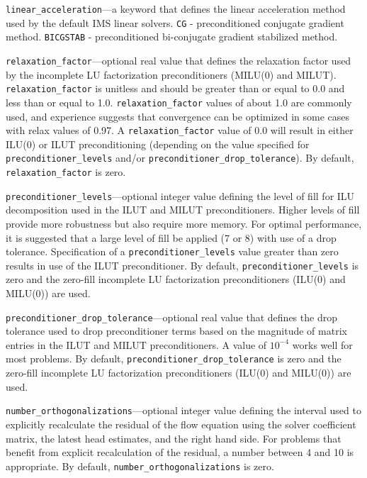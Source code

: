 \begin{description}
\item \texttt{linear\_acceleration}---a keyword that defines the linear acceleration method used by the default IMS linear solvers.  \texttt{CG} - preconditioned conjugate gradient method.  \texttt{BICGSTAB} - preconditioned bi-conjugate gradient stabilized method.

\item \texttt{relaxation\_factor}---optional real value that defines the relaxation factor used by the incomplete LU factorization preconditioners (MILU(0) and MILUT). \texttt{relaxation\_factor} is unitless and should be greater than or equal to 0.0 and less than or equal to 1.0. \texttt{relaxation\_factor} values of about 1.0 are commonly used, and experience suggests that convergence can be optimized in some cases with relax values of 0.97. A \texttt{relaxation\_factor} value of 0.0 will result in either ILU(0) or ILUT preconditioning (depending on the value specified for \texttt{preconditioner\_levels} and/or \texttt{preconditioner\_drop\_tolerance}). By default,  \texttt{relaxation\_factor} is zero.

\item \texttt{preconditioner\_levels}---optional integer value defining the level of fill for ILU decomposition used in the ILUT and MILUT preconditioners. Higher levels of fill provide more robustness but also require more memory. For optimal performance, it is suggested that a large level of fill be applied (7 or 8) with use of a drop tolerance. Specification of a \texttt{preconditioner\_levels} value greater than zero results in use of the ILUT preconditioner. By default, \texttt{preconditioner\_levels} is zero and the zero-fill incomplete LU factorization preconditioners (ILU(0) and MILU(0)) are used.

\item \texttt{preconditioner\_drop\_tolerance}---optional real value that defines the drop tolerance used to drop preconditioner terms based on the magnitude of matrix entries in the ILUT and MILUT preconditioners. A value of $10^{-4}$ works well for most problems. By default, \texttt{preconditioner\_drop\_tolerance} is zero and the zero-fill incomplete LU factorization preconditioners (ILU(0) and MILU(0)) are used.

\item \texttt{number\_orthogonalizations}---optional integer value defining the interval used to explicitly recalculate the residual of the flow equation using the solver coefficient matrix, the latest head estimates, and the right hand side. For problems that benefit from explicit recalculation of the residual, a number between 4 and 10 is appropriate. By default, \texttt{number\_orthogonalizations} is zero.


\end{description}
